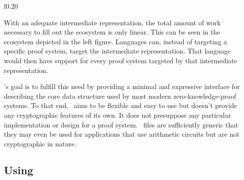 \newcommand{\lineOV}{(lO.center) to[out=-45, in=135] (V.center)}
\newcommand{\lineVO}{(V.center) to[out=45, in=225] (sO.center)}
\newcommand{\lineTV}{(lT.center) to[out=0, in=180] (V.center)}
\newcommand{\lineVT}{(V.center) to[out=0, in=180] (sT.center)}
\newcommand{\lineRV}{(lR.center) to[out=45, in=225] (V.center)}
\newcommand{\lineVR}{(V.center) to[out=-45, in=135] (sR.center)}

\begin{wrapfigure}{l}{0.20\textwidth} %
    \centering
\end{wrapfigure}

With an adequate intermediate representation, the total amount of work necessary to fill out the ecosystem is only linear. This can be seen in the ecosystem depicted in the left figure. Languages can, instead of targeting a specific proof system, target the intermediate representation. That language would then have support for every proof system targeted by that intermediate representation.

\vampir's goal is to fulfill this need by providing a minimal and expressive interface for describing the core data structure used by most modern zero-knowledge-proof systems. To that end, \vampir\ aims to be flexible and easy to use but doesn't provide any cryptographic features of its own. It does not presuppose any particular implementation or design for a proof system. \vampir\ files are sufficiently generic that they may even be used for applications that use arithmetic circuits but are not cryptographic in nature.

\subsection{Using \vampir}

